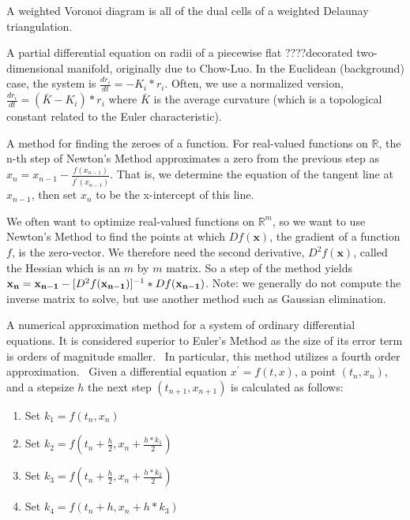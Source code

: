 \begin{description}
\item[weighted Voronoi diagram (or cell)] A weighted Voronoi diagram is all
of the dual cells of a weighted Delaunay triangulation.

\item[combinatorial Ricci flow] A partial differential equation on radii of
a piecewise flat ????decorated two-dimensional manifold, originally due to
Chow-Luo. In the Euclidean (background) case, the system is $\frac{dr_{i}}{dt%
}=-K_{i}\ast r_{i}$. Often, we use a normalized version, $\frac{dr_{i}}{dt}=(%
\bar{K}-K_{i})\ast r_{i}$ where $\bar{K}$ is the average curvature (which is
a topological constant related to the Euler characteristic).

\item[Newton's method] A method for finding the zeroes of a function. For
real-valued functions on $\mathbb{R}$, the n-th step of Newton's Method
approximates a zero from the previous step as $x_{n}=x_{n-1}-\frac{f(x_{n-1})%
}{f^{\prime }(x_{n-1})}$. That is, we determine the equation of the tangent
line at $x_{n-1}$, then set $x_{n}$ to be the x-intercept of this line.%
\newline

\item We often want to optimize real-valued functions on $\mathbb{R}^{m}$,
so we want to use Newton's Method to find the points at which $Df(\mathbf{x}%
) $, the gradient of a function $f$, is the zero-vector. We therefore need
the second derivative, $D^{2}f(\mathbf{x})$, called the Hessian which is an $%
m$ by $m$ matrix. So a step of the method yields $\mathbf{x_{n}}=\mathbf{%
x_{n-1}}-[D^{2}f(\mathbf{x_{n-1}})]^{-1}\ast Df(\mathbf{x_{n-1}})$. Note: we
generally do not compute the inverse matrix to solve, but use another method
such as Gaussian elimination.

\item[Runge-Kutta method] A numerical approximation method for a system of
ordinary differential equations. It is considered superior to Euler's Method
as the size of its error term is orders of magnitude smaller. \ In
particular, this method utilizes a fourth order approximation. \ Given a
differential equation $x^{\prime }=f(t,x)$, a point $(t_{n},x_{n})$, and a
stepsize $h$ the next step $(t_{n+1},x_{n+1})$ is calculated as follows:
\end{description}

\begin{enumerate}
\item Set $k_{1}=f(t_{n},x_{n})$

\item Set $k_{2}=f(t_{n}+\frac{h}{2},x_{n}+\frac{h\ast k_{1}}{2})$

\item Set $k_{3}=f(t_{n}+\frac{h}{2},x_{n}+\frac{h\ast k_{2}}{2})$

\item Set $k_{4}=f(t_{n}+h,x_{n}+h\ast k_{3})$
\end{enumerate}

